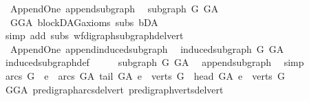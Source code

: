 \begin{isabellebody}
%
\endisadelimproof
\isanewline
{}\isamarkupfalse%
\ {\isacharparenleft}{\kern0pt}\ Append{\isacharunderscore}{\kern0pt}One{\isacharparenright}{\kern0pt}\ append{\isacharunderscore}{\kern0pt}subgraph{\isacharcolon}{\kern0pt}\ \isanewline
\ {\isachardoublequoteopen}subgraph\ G\ G{\isacharunderscore}{\kern0pt}A\ {\isachardoublequoteclose}\ \isanewline
%
\isadelimproof
\ \ %
\endisadelimproof
%
\isatagproof
{}\isamarkupfalse%
\ \ GG{\isacharunderscore}{\kern0pt}A\ blockDAG{\isacharunderscore}{\kern0pt}axioms\ subs\ bD{\isacharunderscore}{\kern0pt}A\isanewline
\ \ \isamarkupfalse%
\ {\isacharparenleft}{\kern0pt}simp\ add{\isacharcolon}{\kern0pt}\ subs\ wf{\isacharunderscore}{\kern0pt}digraph{\isachardot}{\kern0pt}subgraph{\isacharunderscore}{\kern0pt}del{\isacharunderscore}{\kern0pt}vert{\isacharparenright}{\kern0pt}%
\endisatagproof
{\isafoldproof}%
%
\isadelimproof
\ \isanewline
%
\endisadelimproof
\isanewline
{}\isamarkupfalse%
\ {\isacharparenleft}{\kern0pt}\ Append{\isacharunderscore}{\kern0pt}One{\isacharparenright}{\kern0pt}\ append{\isacharunderscore}{\kern0pt}induced{\isacharunderscore}{\kern0pt}subgraph{\isacharcolon}{\kern0pt}\ \isanewline
\ {\isachardoublequoteopen}induced{\isacharunderscore}{\kern0pt}subgraph\ G\ G{\isacharunderscore}{\kern0pt}A\ {\isachardoublequoteclose}\isanewline
%
\isadelimproof
\ \ %
\endisadelimproof
%
\isatagproof
{}\isamarkupfalse%
\ induced{\isacharunderscore}{\kern0pt}subgraph{\isacharunderscore}{\kern0pt}def\isanewline
{}\isamarkupfalse%
\ \isanewline
\ \ \isamarkupfalse%
\ {\isachardoublequoteopen}subgraph\ G\ G{\isacharunderscore}{\kern0pt}A{\isachardoublequoteclose}\ \isamarkupfalse%
\ append{\isacharunderscore}{\kern0pt}subgraph\ \isamarkupfalse%
\ simp\isanewline
\ \ \isamarkupfalse%
\ {\isachardoublequoteopen}arcs\ G\ {\isacharequal}{\kern0pt}\ {\isacharbraceleft}{\kern0pt}e\ {\isasymin}\ arcs\ G{\isacharunderscore}{\kern0pt}A{\isachardot}{\kern0pt}\ tail\ G{\isacharunderscore}{\kern0pt}A\ e\ {\isasymin}\ verts\ G\ {\isasymand}\ head\ G{\isacharunderscore}{\kern0pt}A\ e\ {\isasymin}\ verts\ G{\isacharbraceright}{\kern0pt}{\isachardoublequoteclose}\isanewline
\ \ \ \ \isamarkupfalse%
\ GG{\isacharunderscore}{\kern0pt}A\ pre{\isacharunderscore}{\kern0pt}digraph{\isachardot}{\kern0pt}arcs{\isacharunderscore}{\kern0pt}del{\isacharunderscore}{\kern0pt}vert\ pre{\isacharunderscore}{\kern0pt}digraph{\isachardot}{\kern0pt}verts{\isacharunderscore}{\kern0pt}del{\isacharunderscore}{\kern0pt}vert\isanewline

\end{isabellebody}
